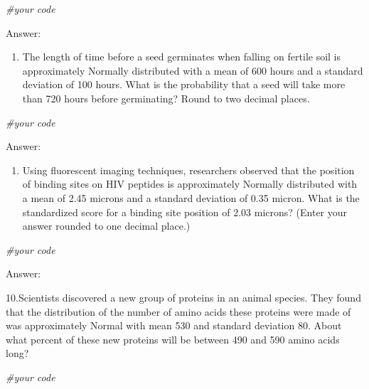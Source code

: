 \documentclass[
]{article}
\newenvironment{Shaded}{\begin{snugshade}}{\end{snugshade}}
\newcommand{\CommentTok}[1]{\textcolor[rgb]{0.56,0.35,0.01}{\textit{#1}}}
\providecommand{\tightlist}{%
  \setlength{\itemsep}{0pt}\setlength{\parskip}{0pt}}
\begin{document}
\begin{Shaded}
\begin{Highlighting}[]
\CommentTok{\#your code}
\end{Highlighting}
\end{Shaded}

Answer:

\begin{enumerate}
\def\labelenumi{\arabic{enumi}.}
\setcounter{enumi}{7}
\tightlist
\item
  The length of time before a seed germinates when falling on fertile
  soil is approximately Normally distributed with a mean of 600 hours
  and a standard deviation of 100 hours. What is the probability that a
  seed will take more than 720 hours before germinating? Round to two
  decimal places.
\end{enumerate}

\begin{Shaded}
\begin{Highlighting}[]
\CommentTok{\#your code}
\end{Highlighting}
\end{Shaded}

Answer:

\begin{enumerate}
\def\labelenumi{\arabic{enumi}.}
\setcounter{enumi}{8}
\tightlist
\item
  Using fluorescent imaging techniques, researchers observed that the
  position of binding sites on HIV peptides is approximately Normally
  distributed with a mean of 2.45 microns and a standard deviation of
  0.35 micron. What is the standardized score for a binding site
  position of 2.03 microns? (Enter your answer rounded to one decimal
  place.)
\end{enumerate}

\begin{Shaded}
\begin{Highlighting}[]
\CommentTok{\#your code}
\end{Highlighting}
\end{Shaded}

Answer:

10.Scientists discovered a new group of proteins in an animal species.
They found that the distribution of the number of amino acids these
proteins were made of was approximately Normal with mean 530 and
standard deviation 80. About what percent of these new proteins will be
between 490 and 590 amino acids long?

\begin{Shaded}
\begin{Highlighting}[]
\CommentTok{\#your code}
\end{Highlighting}
\end{Shaded}
\end{document}

